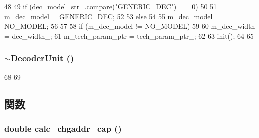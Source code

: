 \begin{DoxyCode}
48 {
49     if (dec_model_str_.compare("GENERIC_DEC") == 0)
50     {
51         m_dec_model = GENERIC_DEC;
52     }
53     else
54     {
55         m_dec_model = NO_MODEL;
56     }
57 
58     if (m_dec_model != NO_MODEL)
59     {
60         m_dec_width = dec_width_;
61         m_tech_param_ptr = tech_param_ptr_;
62 
63         init();
64     }
65 }
\end{DoxyCode}
\hypertarget{classDecoderUnit_a1e5ebc6c8b7ab089ce33839a9f5601fe}{
\subsubsection[{$\sim$DecoderUnit}]{\setlength{\rightskip}{0pt plus 5cm}$\sim${\bf DecoderUnit} ()}}
\label{classDecoderUnit_a1e5ebc6c8b7ab089ce33839a9f5601fe}



\begin{DoxyCode}
68 {
69 }
\end{DoxyCode}


\subsection{関数}
\hypertarget{classDecoderUnit_a22285c76512432112703b7a761841c3e}{
\subsubsection[{calc\_\-chgaddr\_\-cap}]{\setlength{\rightskip}{0pt plus 5cm}double calc\_\-chgaddr\_\-cap ()}}
\label{classDecoderUnit_a22285c76512432112703b7a761841c3e}



